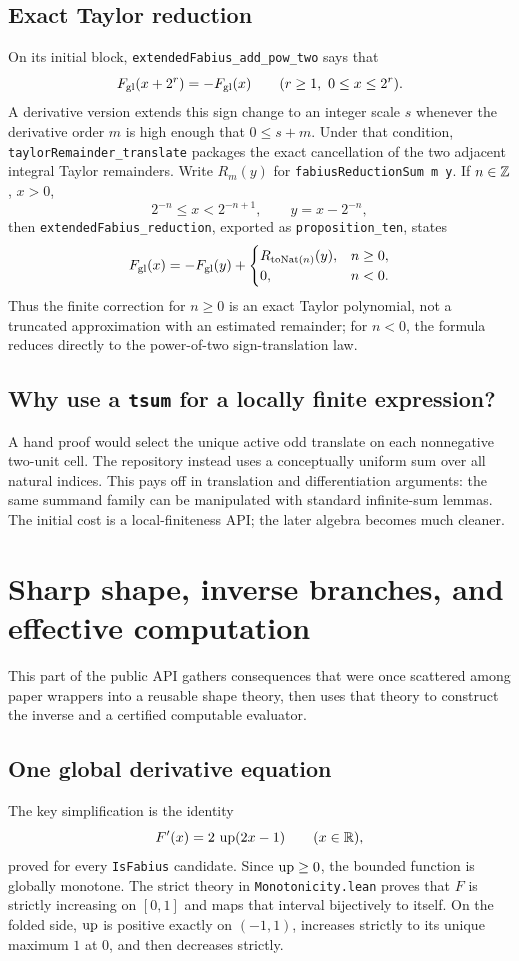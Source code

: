 \documentclass[11pt,oneside]{article}
\theoremstyle{definition}
\theoremstyle{remark}
\begin{document}
\subsection{Exact Taylor reduction}
On its initial block, \nolinkurl{extendedFabius_add_pow_two} says that
\[
  F_{\mathrm{gl}}(x+2^r)=-F_{\mathrm{gl}}(x)
  \qquad(r\geq1,\ 0\leq x\leq2^r).
\]
A derivative version extends this sign change to an integer scale \(s\)
whenever the derivative order \(m\) is high enough that \(0\leq s+m\).
Under that condition, \nolinkurl{taylorRemainder_translate} packages the exact
cancellation of the two adjacent integral Taylor remainders.  Write \(R_m(y)\)
for \nolinkurl{fabiusReductionSum m y}.  If \(n\in\mathbb{Z}\),
\(x>0\),
\[
  2^{-n}\leq x<2^{-n+1},
  \qquad y=x-2^{-n},
\]
then \nolinkurl{extendedFabius_reduction}, exported as
\nolinkurl{proposition_ten}, states
\[
  F_{\mathrm{gl}}(x)=-F_{\mathrm{gl}}(y)+
  \begin{cases}
    R_{\operatorname{toNat}(n)}(y),& n\geq0,\\
    0,& n<0.
  \end{cases}
\]
Thus the finite correction for \(n\geq0\) is an exact Taylor polynomial,
not a truncated approximation with an estimated remainder; for \(n<0\),
the formula reduces directly to the power-of-two sign-translation law.

\subsection{Why use a \texttt{tsum} for a locally finite expression?}
A hand proof would select the unique active odd translate on each nonnegative two-unit cell.  The repository instead uses a conceptually uniform sum over all natural indices.  This pays off in translation and differentiation arguments: the same summand family can be manipulated with standard infinite-sum lemmas.  The initial cost is a local-finiteness API; the later algebra becomes much cleaner.

\section{Sharp shape, inverse branches, and effective computation}\label{ch:regularity}

This part of the public API gathers consequences that were once scattered
among paper wrappers into a reusable shape theory, then uses that theory to
construct the inverse and a certified computable evaluator.

\subsection{One global derivative equation}
The key simplification is the identity
\[
  F'(x)=2\,\operatorname{up}(2x-1)\qquad(x\in\mathbb{R}),
\]
proved for every \nolinkurl{IsFabius} candidate.  Since \(\operatorname{up}\geq0\), the bounded
function is globally monotone.  The strict theory in
\nolinkurl{Monotonicity.lean} proves that \(F\) is strictly increasing on
\([0,1]\) and maps that interval bijectively to itself.  On the folded side,
\(\operatorname{up}\) is positive exactly on \((-1,1)\), increases strictly to its unique
maximum \(1\) at \(0\), and then decreases strictly.
\end{document}
